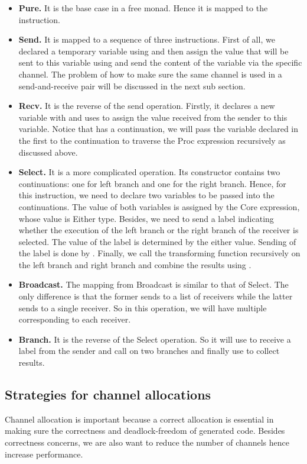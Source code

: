 \begin{itemize}
    \item \textbf{Pure. } It is the base case in a free monad. Hence it is mapped to the  instruction.
    \item \textbf{Send. } It is mapped to a sequence of three instructions. First of all, we declared a temporary variable using  and then assign the value that will be sent to this variable using  and send the content of the variable via the specific channel. The problem of how to make sure the same channel is used in a send-and-receive pair will be discussed in the next sub section.
    \item \textbf{Recv. } It is the reverse of the send operation. Firstly, it declares a new variable with  and uses  to assign the value received from the sender to this variable. Notice that  has a continuation, we will pass the variable declared in the first  to the continuation to traverse the Proc expression recursively as discussed above. 
    \item \textbf{Select. } It is a more complicated operation. Its constructor contains two continuations: one for left branch and one for the right branch. Hence, for this instruction, we need to declare two variables to be passed into the continuations. The value of both variables is assigned by the Core expression, whose value is Either type. Besides, we need to send a label indicating whether the execution of the left branch or the right branch of the receiver is selected. The value of the label is determined by the either value. Sending of the label is done by . Finally, we call the transforming function recursively on the left branch and right branch and combine the results using .
    \item \textbf{Broadcast. } The mapping from Broadcast is similar to that of Select. The only difference is that the former sends to a list of receivers while the latter sends to a single receiver. So in this operation, we will have multiple  corresponding to each receiver.  
    \item \textbf{Branch. } It is the reverse of the Select operation. So it will use  to receive a label from the sender and call on two branches and finally use  to collect results.
\end{itemize}
\subsection{Strategies for channel allocations}
Channel allocation is important because a correct allocation is essential in making sure the correctness and deadlock-freedom of generated code. Besides correctness concerns, we are also want to reduce the number of channels hence increase performance. 

